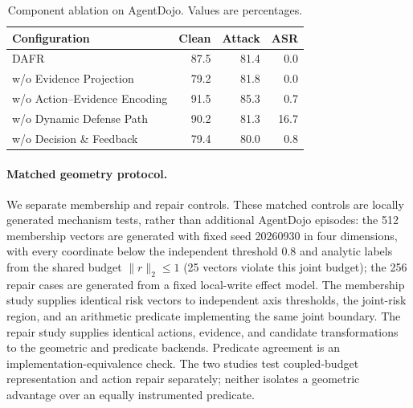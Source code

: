 \documentclass[letterpaper]{article}
\begin{document}
\begin{table}[ht]
\centering
\small
\setlength{\tabcolsep}{3.5pt}
\begin{tabular}{lrrr}
\toprule
Configuration & Clean & Attack & ASR\\
\midrule
DAFR & 87.5 & 81.4 & 0.0\\
w/o Evidence Projection & 79.2 & 81.8 & 0.0\\
w/o Action--Evidence Encoding & 91.5 & 85.3 & 0.7\\
w/o Dynamic Defense Path & 90.2 & 81.3 & 16.7\\
w/o Decision \& Feedback & 79.4 & 80.0 & 0.8\\
\bottomrule
\end{tabular}
\caption{Component ablation on AgentDojo. Values are percentages.}
\label{tab:ablation}
\end{table}
\paragraph{Matched geometry protocol.}
We separate membership and repair controls. These matched controls are locally generated mechanism tests, rather than additional AgentDojo episodes: the 512 membership vectors are generated with fixed seed 20260930 in four dimensions, with every coordinate below the independent threshold 0.8 and analytic labels from the shared budget $\lVert r\rVert_2\leq1$ (25 vectors violate this joint budget); the 256 repair cases are generated from a fixed local-write effect model. The membership study supplies identical risk vectors to independent axis thresholds, the joint-risk region, and an arithmetic predicate implementing the same joint boundary. The repair study supplies identical actions, evidence, and candidate transformations to the geometric and predicate backends. Predicate agreement is an implementation-equivalence check. The two studies test coupled-budget representation and action repair separately; neither isolates a geometric advantage over an equally instrumented predicate.
\end{document}
